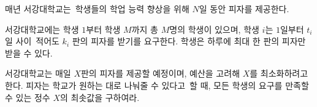매년 서강대학교는 학생들의 학업 능력 향상을 위해 $N$일 동안 피자를 제공한다.

서강대학교에는 학생 $1$부터 학생 $M$까지 총 $M$명의 학생이 있으며, 학생 $i$는 $1$일부터 $t_i$일 사이 적어도 $k_i$ 판의 피자를 받기를 요구한다. 학생은 하루에 최대 한 판의 피자만 받을 수 있다.

서강대학교는 매일 $X$판의 피자를 제공할 예정이며, 예산을 고려해 $X$를 최소화하려고 한다. 피자는 학교가 원하는 대로 나눠줄 수 있다고 할 때, 모든 학생의 요구를 만족할 수 있는 정수 $X$의 최솟값을 구하여라.